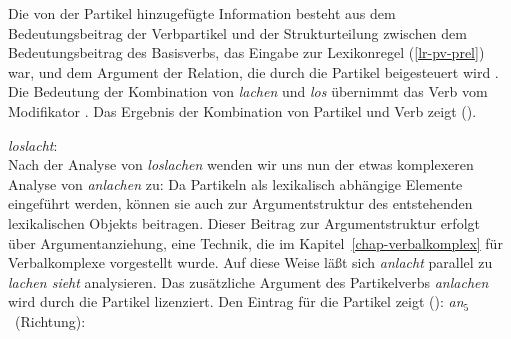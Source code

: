 \noindent
Die von der Partikel hinzugefügte Information besteht aus dem Bedeutungsbeitrag der Verbpartikel
und der Strukturteilung zwischen dem Bedeutungsbeitrag
des Basisverbs, das Eingabe zur Lexikonregel (\ref{lr-pv-prel}) war, und dem Argument der Relation,
die durch die Partikel beigesteuert wird . 
Die Bedeutung der Kombination von \emph{lachen} und \emph{los} übernimmt das Verb vom Modifikator
. 
Das Ergebnis der Kombination von Partikel und Verb zeigt ().

\eas
\label{le-loslacht}
\emph{loslacht}:\\
\zs
Nach der Analyse von \emph{loslachen} wenden wir uns nun der etwas komplexeren Analyse von
\emph{anlachen} zu: Da Partikeln als lexikalisch abhängige Elemente eingeführt werden, 
können sie auch zur Argumentstruktur des entstehenden lexikalischen Objekts
beitragen. Dieser Beitrag zur Argumentstruktur erfolgt über Argumentanziehung,
eine Technik, die im Kapitel~\ref{chap-verbalkomplex} für Verbalkomplexe vorgestellt
wurde. Auf diese Weise läßt sich \emph{anlacht} parallel zu \emph{lachen sieht}
analysieren. Das zusätzliche Argument des Partikelverbs \emph{anlachen} wird durch
die Partikel lizenziert. Den Eintrag für die Partikel zeigt ():
\eas
\label{le-an5}
\mbox{\emph{an$_5$} (Richtung):}\\
\zs

